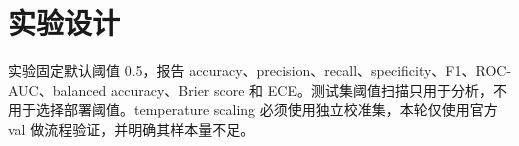 \chapter{实验设计}

实验固定默认阈值 0.5，报告 accuracy、precision、recall、specificity、F1、ROC-AUC、balanced accuracy、Brier score 和 ECE。测试集阈值扫描只用于分析，不用于选择部署阈值。temperature scaling 必须使用独立校准集，本轮仅使用官方 val 做流程验证，并明确其样本量不足。
